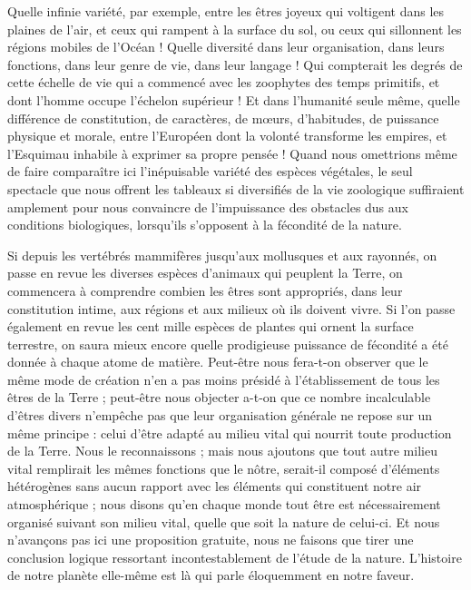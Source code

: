 \documentclass[a4paper, 11pt, oneside]{article}
\begin{document}
Quelle infinie variété, par exemple, entre les êtres joyeux qui voltigent dans les plaines de l'air, et ceux qui rampent à la surface du sol, ou ceux qui sillonnent les régions mobiles de l'Océan ! Quelle diversité dans leur organisation, dans leurs fonctions, dans leur genre de vie, dans leur langage ! Qui compterait les degrés de cette échelle de vie qui a commencé avec les zoophytes des temps primitifs, et dont l'homme occupe l'échelon supérieur ! Et dans l'humanité seule même, quelle différence de constitution, de caractères, de mœurs, d'habitudes, de puissance physique et morale, entre l'Européen dont la volonté transforme les empires, et l'Esquimau inhabile à exprimer sa propre pensée ! Quand nous omettrions même de faire comparaître ici l'inépuisable variété des espèces végétales, le seul spectacle que nous offrent les tableaux si diversifiés de la vie zoologique suffiraient amplement pour nous convaincre de l'impuissance des obstacles dus aux conditions biologiques, lorsqu'ils s'opposent à la fécondité de la nature.

Si depuis les vertébrés mammifères jusqu'aux mollusques et aux rayonnés, on passe en revue les diverses espèces d'animaux qui peuplent la Terre, on commencera à comprendre combien les êtres sont appropriés, dans leur constitution intime, aux régions et aux milieux où ils doivent vivre. Si l'on passe également en revue les cent mille espèces de plantes qui ornent la surface terrestre, on saura mieux encore quelle prodigieuse puissance de fécondité a été donnée à chaque atome de matière. Peut-être nous fera-t-on observer que le même mode de création n'en a pas moins présidé à l'établissement de tous les êtres de la Terre ; peut-être nous objecter a-t-on que ce nombre incalculable d'êtres divers n'empêche pas que leur organisation générale ne repose sur un même principe : celui d'être adapté au milieu vital qui nourrit toute production de la Terre. Nous le reconnaissons ; mais nous ajoutons que tout autre milieu vital remplirait les mêmes fonctions que le nôtre, serait-il composé d'éléments hétérogènes sans aucun rapport avec les éléments qui constituent notre air atmosphérique ; nous disons qu'en chaque monde tout être est nécessairement organisé suivant son milieu vital, quelle que soit la nature de celui-ci. Et nous n'avançons pas ici une proposition gratuite, nous ne faisons que tirer une conclusion logique ressortant incontestablement de l'étude de la nature. L'histoire de notre planète elle-même est là qui parle éloquemment en notre faveur.
\end{document}
